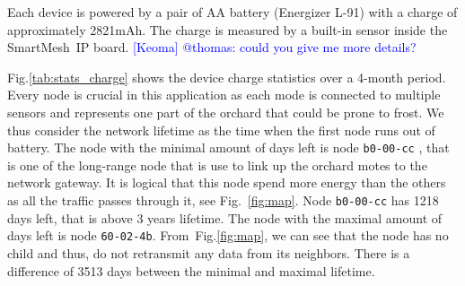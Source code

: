 \documentclass{sig-alternate}
\newcommand{\keoma}[1]       {\textcolor{blue}{[Keoma] #1}}
\newcommand{\smip}           {SmartMesh~IP\xspace}
\begin{document}

Each device is powered by a pair of AA battery (Energizer L-91) with a charge of approximately 2821mAh.
The charge is measured by a built-in sensor inside the \smip board. \keoma{@thomas: could you give me more details?}


Fig.\ref{tab:stats_charge} shows the device charge statistics over a 4-month period.
Every node is crucial in this application as each mode is connected to multiple sensors and represents one part of the orchard that could be prone to frost.
We thus consider the network lifetime as the time when the first node runs out of battery.
The node with the minimal amount of days left is node {\tt b0-00-cc} , that is one of the long-range node that is use to link up the orchard motes to the network gateway.
It is logical that this node spend more energy than the others as all the traffic passes through it, see Fig.~\ref{fig:map}.
Node {\tt b0-00-cc} has 1218 days left, that is above 3 years lifetime.
The node with the maximal amount of days left is node {\tt 60-02-4b}.
From~Fig.\ref{fig:map}, we can see that the node has no child and thus, do not retransmit any data from its neighbors.
There is a difference of 3513 days between the minimal and maximal lifetime.
\end{document}

